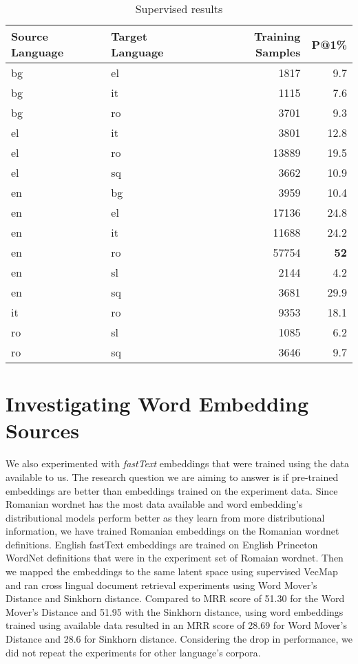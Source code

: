 \begin{table}[htp]
    \centering
    \begin{tabulary}{0.65\linewidth}{LLRr}
        \toprule
        Source Language & Target Language & Training Samples & P@1\% \\
        \midrule
        bg & el & 1817 & 9.7 \\
        bg & it & 1115 & 7.6 \\
        bg & ro & 3701 & 9.3 \\
        el & it & 3801 & 12.8 \\
        el & ro & 13889 & 19.5 \\
        el & sq & 3662 & 10.9 \\
        en & bg & 3959 & 10.4 \\
        en & el & 17136 & 24.8 \\
        en & it & 11688 & 24.2 \\
        en & ro & 57754 & \textbf{52} \\
        en & sl & 2144 & 4.2 \\
        en & sq & 3681 & 29.9 \\
        it & ro & 9353 & 18.1 \\
        ro & sl & 1085 & 6.2 \\
        ro & sq & 3646 & 9.7 \\
        \bottomrule
    \end{tabulary}
    \caption{Supervised results}%
    \label{tab:supervised_results}
    \end{table}

\section{Investigating Word Embedding Sources}%
\label{sec:investigating_word_embedding_sources}

We also experimented with \emph{fastText} embeddings that were trained using the data available to us.
The research question we are aiming to answer is if pre-trained embeddings are better than embeddings trained on the experiment data.
Since Romanian wordnet has the most data available and word embedding's distributional models perform better as they learn from more distributional information, we have trained Romanian embeddings on the Romanian wordnet definitions.
English fastText embeddings are trained on English Princeton WordNet definitions that were in the experiment set of Romaian wordnet.
Then we mapped the embeddings to the same latent space using supervised VecMap and ran cross lingual document retrieval experiments using Word Mover's Distance and Sinkhorn distance.
Compared to MRR score of 51.30 for the Word Mover's Distance and 51.95 with the Sinkhorn distance, using word embeddings trained using available data resulted in an MRR score of 28.69 for Word Mover's Distance and 28.6 for Sinkhorn distance.
Considering the drop in performance, we did not repeat the experiments for other language's corpora.

